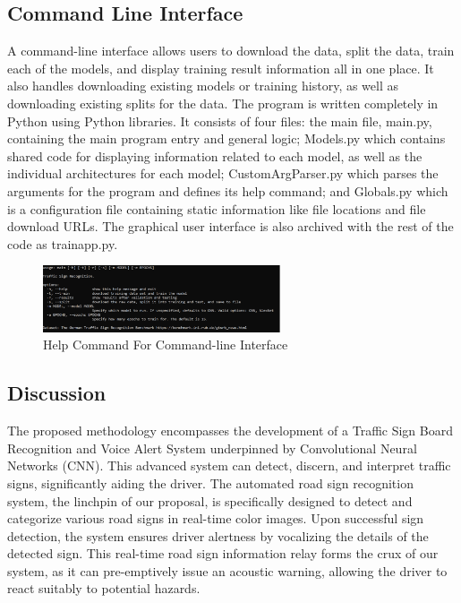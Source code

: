 \documentclass[conference]{IEEEtran}
\begin{document}
\subsection{Command Line Interface}
A command-line interface allows users to download the data, split the data, train each of the models, and display training result information all in one place. It also handles downloading existing models or training history, as well as downloading existing splits for the data. The program is written completely in Python using Python libraries. It consists of four files: the main file, main.py, containing the main program entry and general logic; Models.py which contains shared code for displaying information related to each model, as well as the individual architectures for each model; CustomArgParser.py which parses the arguments for the program and defines its help command; and Globals.py which is a configuration file containing static information like file locations and file download URLs. The graphical user interface is also archived with the rest of the code as trainapp.py.
\begin{figure}[htp]
    \centering
    \includegraphics[width=7cm]{images/CLI.png}
    \centering
    \caption{Help Command For Command-line Interface}
    \end{figure}
\subsection{Discussion}
The proposed methodology encompasses the development of a Traffic Sign Board Recognition and Voice Alert System underpinned by Convolutional Neural Networks (CNN). This advanced system can detect, discern, and interpret traffic signs, significantly aiding the driver. The automated road sign recognition system, the linchpin of our proposal, is specifically designed to detect and categorize various road signs in real-time color images. Upon successful sign detection, the system ensures driver alertness by vocalizing the details of the detected sign. This real-time road sign information relay forms the crux of our system, as it can pre-emptively issue an acoustic warning, allowing the driver to react suitably to potential hazards.
\end{document}
